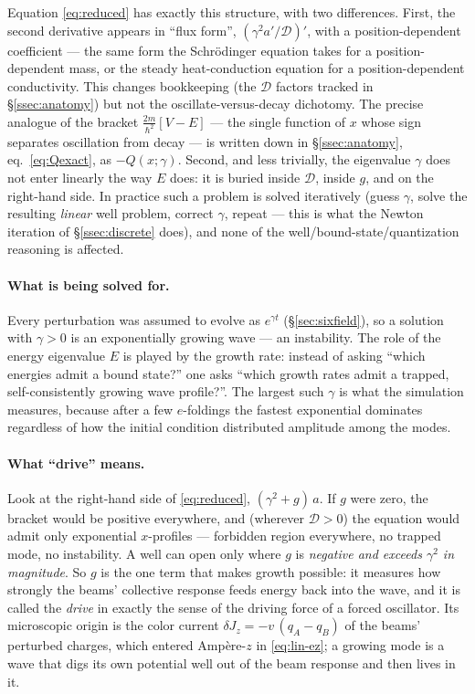 \documentclass[11pt,a4paper]{article}
\numberwithin{equation}{section}
\theoremstyle{remark}
\newcommand{\D}{\mathcal{D}}
\begin{document}
Equation \eqref{eq:reduced} has exactly this structure, with two
differences. First, the second derivative appears in ``flux form'',
$(\gamma^2a'/\D)'$, with a position-dependent coefficient --- the same
form the Schr\"odinger equation takes for a position-dependent mass, or
the steady heat-conduction equation for a position-dependent
conductivity. This changes bookkeeping (the $\D$ factors tracked in
\S\ref{ssec:anatomy}) but not the oscillate-versus-decay dichotomy. The
precise analogue of the bracket $\tfrac{2m}{\hbar^2}[V-E]$ --- the
single function of $x$ whose sign separates oscillation from decay ---
is written down in \S\ref{ssec:anatomy}, eq.~\eqref{eq:Qexact}, as
$-Q(x;\gamma)$. Second, and less trivially, the eigenvalue $\gamma$
does not enter linearly the way $E$ does: it is buried inside $\D$,
inside $g$, and on the right-hand side. In practice such a problem is
solved iteratively (guess $\gamma$, solve the resulting \emph{linear}
well problem, correct $\gamma$, repeat --- this is what the Newton
iteration of \S\ref{ssec:discrete} does), and none of the
well/bound-state/quantization reasoning is affected.

\paragraph{What is being solved for.}
Every perturbation was assumed to evolve as $e^{\gamma t}$
(\S\ref{sec:sixfield}), so a solution with $\gamma>0$ is an
exponentially growing wave --- an instability. The role of the energy
eigenvalue $E$ is played by the growth rate: instead of asking ``which
energies admit a bound state?'' one asks ``which growth rates admit a
trapped, self-consistently growing wave profile?''. The largest such
$\gamma$ is what the simulation measures, because after a few
$e$-foldings the fastest exponential dominates regardless of how the
initial condition distributed amplitude among the modes.

\paragraph{What ``drive'' means.}
Look at the right-hand side of \eqref{eq:reduced}, $(\gamma^2+g)\,a$.
If $g$ were zero, the bracket would be positive everywhere, and
(wherever $\D>0$) the equation would admit only exponential $x$-profiles
--- forbidden region everywhere, no trapped mode, no instability. A well
can open only where $g$ is \emph{negative and exceeds $\gamma^2$ in
magnitude}. So $g$ is the one term that makes growth possible: it
measures how strongly the beams' collective response feeds energy back
into the wave, and it is called the \emph{drive} in exactly the sense of
the driving force of a forced oscillator. Its microscopic origin is the
color current $\delta J_z=-v\,(q_A-q_B)$ of the beams' perturbed
charges, which entered Amp\`ere-$z$ in \eqref{eq:lin-ez}; a growing mode
is a wave that digs its own potential well out of the beam response and
then lives in it.
\end{document}
